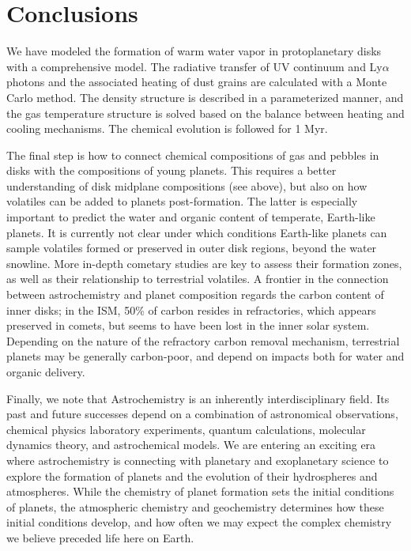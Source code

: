 \chapter{Conclusions}
We have modeled the formation of warm water vapor in protoplanetary disks with a comprehensive model. The radiative transfer of UV continuum and Ly$\alpha$ photons and the associated heating of dust grains are calculated with a Monte Carlo method. The density structure is described in a parameterized manner, and the gas temperature structure is solved based on the balance between heating and cooling mechanisms. The chemical evolution is followed for 1 Myr.

The final step is how to connect chemical compositions of gas and pebbles in disks with the compositions of young planets. This requires a better understanding of disk midplane compositions (see above), but also on how volatiles can be added to planets post-formation. The latter is especially important to predict the water and organic content of temperate, Earth-like planets. It is currently not clear under which conditions Earth-like planets can sample volatiles formed or preserved in outer disk regions, beyond the water snowline. More in-depth cometary studies are key to assess their formation zones, as well as their relationship to terrestrial volatiles. A frontier in the connection between astrochemistry and planet composition regards the carbon content of inner disks; in the ISM, 50\% of carbon resides in refractories, which appears preserved in comets, but seems to have been lost in the inner solar system. Depending on the nature of the refractory carbon removal mechanism, terrestrial planets may be generally carbon-poor, and depend on impacts both for water and organic delivery.

Finally, we note that Astrochemistry is an inherently interdisciplinary field. Its past and future successes depend on a combination of astronomical observations, chemical physics laboratory experiments, quantum calculations, molecular dynamics theory, and astrochemical models. We are entering an exciting era where astrochemistry is connecting with planetary and exoplanetary science to explore the formation of planets and the evolution of their hydrospheres and atmospheres. While the chemistry of planet formation sets the initial conditions of planets, the atmospheric chemistry and geochemistry determines how these initial conditions develop, and how often we may expect the complex chemistry we believe preceded life here on Earth.



